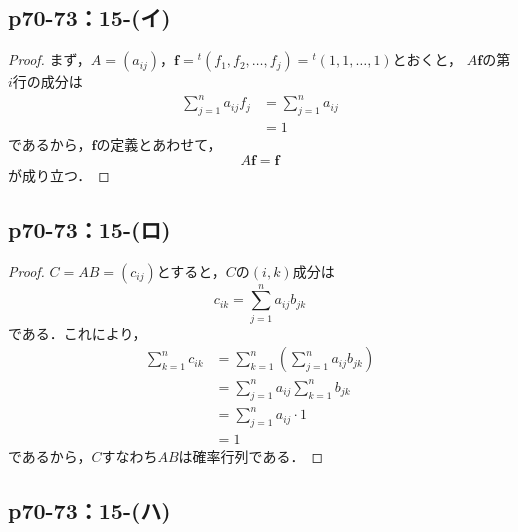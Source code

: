 \documentclass[a4paper,10pt,fleqn]{ltjsarticle}
\begin{document}
\subsection*{p70-73：15-(イ)}
\begin{leftbar}
    \begin{proof}
        まず，$A=(a_{ij})$，$\bm{f} = {}^t (f_1 , f_2,\dots,f_j) ={}^t (1,1,\dots,1)$とおくと，
        $A \bm{f}$の第$i$行の成分は
        \begin{align*}
            \sum_{j=1}^{n} a_{ij} f_j & = \sum_{j=1}^{n} a_{ij} \\
                                      & =1
        \end{align*}
        であるから，$\bm{f}$の定義とあわせて，
        \[
            A \bm{f} =\bm{f}
        \]
        が成り立つ．
    \end{proof}
\end{leftbar}


\subsection*{p70-73：15-(ロ)}

\begin{tleftbar}
    \begin{proof}
        $C =AB=(c_{ij})$とすると，$C$の$(i,k)$成分は
        \[
            c_{ik}  =\sum_{j=1}^{n} a_{ij} b_{jk}
        \]
        である．これにより，
        \begin{align*}
            \sum_{k=1}^{n} c_{ik} & = \sum_{k=1}^{n} \left (\sum_{j=1}^{n} a_{ij} b_{jk}\right) \\
                                  & = \sum_{j=1}^{n} a_{ij} \sum_{k=1}^{n} b_{jk}               \\
                                  & = \sum_{j=1}^{n} a_{ij} \cdot 1                             \\
                                  & = 1
        \end{align*}
        であるから，$C$すなわち$AB$は確率行列である．
    \end{proof}
\end{tleftbar}

\subsection*{p70-73：15-(ハ)}
\end{document}
